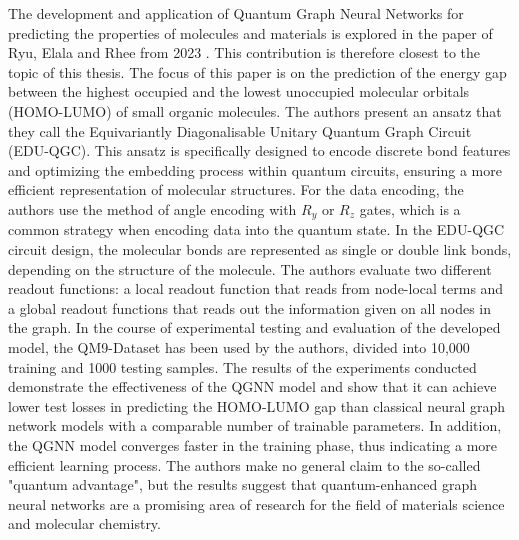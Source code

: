 The development and application of Quantum Graph Neural Networks for predicting the properties of molecules and materials is explored in the paper of Ryu, Elala and Rhee from 2023 \cite{ryu2023quantum}. This contribution is therefore closest to the topic of this thesis. The focus of this paper is on the prediction of the energy gap between the highest occupied and the lowest unoccupied molecular orbitals (HOMO-LUMO) of small organic molecules.  The authors present an ansatz that they call the Equivariantly Diagonalisable Unitary Quantum Graph Circuit (EDU-QGC). This ansatz is specifically designed to encode discrete bond features and optimizing the embedding process within quantum circuits, ensuring a more efficient representation of molecular structures. For the data encoding, the authors use the method of angle encoding with $R_y$ or $R_z$ gates, which is a common strategy when encoding data into the quantum state. In the EDU-QGC circuit design, the molecular bonds are represented as single or double link bonds, depending on the structure of the molecule. The authors evaluate two different readout functions: a local readout function that reads from node-local terms and a global readout functions that reads out the information given on all nodes in the graph.
In the course of experimental testing and evaluation of the developed model, the QM9-Dataset has been used by the authors, divided into 10,000 training and 1000 testing samples.  The results of the experiments conducted demonstrate the effectiveness of the QGNN model and show that it can achieve lower test losses in predicting the HOMO-LUMO gap than classical neural graph network models with a comparable number of trainable parameters. In addition, the QGNN model converges faster in the training phase, thus indicating a more efficient learning process. The authors make no general claim to the so-called "quantum advantage", but the results suggest that quantum-enhanced graph neural networks are  a promising area of research for the field of materials science and molecular chemistry. \\

